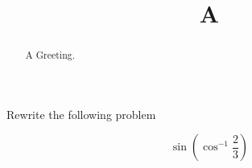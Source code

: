 \documentclass{ximera}
\title[A]{A}
\begin{document}
\begin{abstract}
A Greeting.
\end{abstract}

\maketitle

Rewrite the following problem

\[ \sin \left (\cos^{-1}  \frac{2}{3} \right)\]

\begin{question}
\begin{multipleChoice}
\end{multipleChoice}
\end{question}
\end{document}
